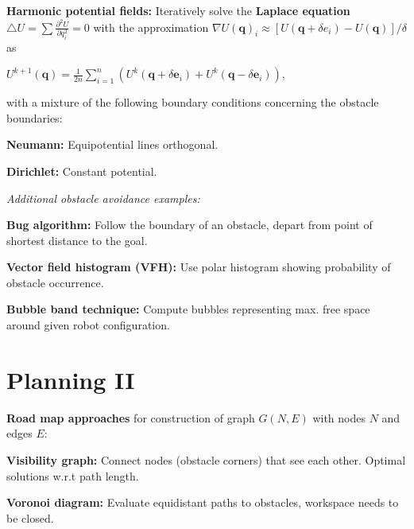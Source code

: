\documentclass[landscape]{article}
\newcommand{\vmspace}{\vspace{-7pt}}
\newcommand{\vpspace}{\vspace{5pt}}
\newcommand{\vtspace}{\vspace{-10pt}}
\begin{document}
\begin{multicols}{3}
\begin{minipage}{\columnwidth}
  \textbf{Harmonic potential fields:} Iteratively solve the \textbf{Laplace
  equation}
  $
  \bigtriangleup U = \sum \frac{\partial^2 U}{\partial q_i^2} = 0
  $ with the approximation
  $
  \nabla U(\mathbf q)_i
  \approx
  [U(\mathbf q + \delta e_i) - U(\mathbf q)]/\delta
  $
  as
  \vmspace
  \begin{center}
    $
    U^{k+1}(\mathbf q)
    =
    \frac{1}{2n} \sum_{i=1}^n(U^k(\mathbf q + \delta \mathbf e_i)
    + U^k(\mathbf q - \delta \mathbf e_i)),
    $
  \end{center}
  \vmspace
  with a mixture of the following boundary conditions concerning the obstacle
  boundaries:
  \begin{compactitem}
  \item \textbf{Neumann:} Equipotential lines orthogonal.
  \item \textbf{Dirichlet:} Constant potential.
  \end{compactitem}
\end{minipage}

\vpspace

\begin{minipage}{\columnwidth}
  \textit{Additional obstacle avoidance examples:}
  \begin{compactitem}
  \item \textbf{Bug algorithm:} Follow the boundary of an obstacle, depart from
    point of shortest distance to the goal.
  \item \textbf{Vector field histogram (VFH):} Use polar histogram showing
    probability of obstacle occurrence.
  \item \textbf{Bubble band technique:} Compute bubbles representing max.
    free space around given robot configuration.
  \end{compactitem}
\end{minipage}

\vfill

\vtspace

\section{Planning II}

\vmspace

\begin{minipage}{\columnwidth}
  \textbf{Road map approaches} for construction of graph $G(N,E)$ with nodes $N$
  and edges $E$:
  \begin{compactitem}
  \item \textbf{Visibility graph:} Connect nodes (obstacle corners) that
    see each other. Optimal solutions w.r.t path length.
  \item \textbf{Voronoi diagram:} Evaluate equidistant paths to obstacles,
    workspace needs to be closed.
  \end{compactitem}
\end{minipage}


\end{multicols}
\end{document}
